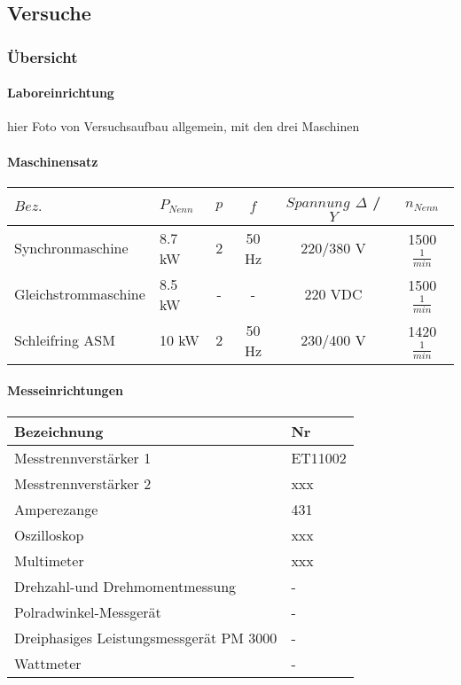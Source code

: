 \begin{flushleft}
\part{Versuche}

\section{Übersicht}

\subsection{Laboreinrichtung}


hier Foto von Versuchsaufbau allgemein, mit den drei Maschinen

\subsection{Maschinensatz}








\begin{tabular}{|L{5cm}|l|c|c|c|c|}
 \hline
  \textbf{$Bez.$} & \textbf{$P_{Nenn}$} & \textbf{$p$} & \textbf{$f$} & \textbf{$Spannung$ $\Delta$ / $Y$} & \textbf{$n_{Nenn}$}  \\
 \hline
Synchronmaschine&8.7 kW &2 &50 Hz&220/380 V&1500 $\frac{1}{min}$\\
\hline
Gleichstrommaschine&8.5 kW & - & - & 220 VDC& 1500 $\frac{1}{min}$\\
\hline
Schleifring ASM &10 kW &2&50 Hz& 230/400 V& 1420 $\frac{1}{min}$\\
\hline

\end{tabular}






\subsection{Messeinrichtungen}




\begin{tabular}{|L{0.8 \textwidth}|l|}
 \hline
  \textbf{Bezeichnung} & \textbf{Nr}  \\
 \hline
 Messtrennverstärker 1  & ET11002  \\
\hline
Messtrennverstärker 2  & xxx  \\
\hline
Amperezange  & 431  \\
\hline
Oszilloskop  & xxx  \\
\hline
Multimeter  & xxx  \\
\hline
Drehzahl-und Drehmomentmessung  & -  \\
\hline
Polradwinkel-Messgerät  & -  \\
\hline
Dreiphasiges Leistungsmessgerät PM 3000  & -  \\
\hline
Wattmeter   & -  \\
\hline
\end{tabular}


\end{flushleft}
